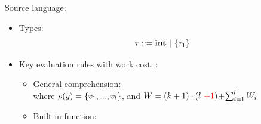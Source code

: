 \documentclass{beamer}
\begin{document}
\begin{frame}{Source language: {\fmsnesl}}
\begin{itemize}
	\item Types: $$\tau ::= \int \ | \ \tseq{\tau_1}$$
 	\item Key evaluation rules with work cost,  : \\
 	\begin{itemize}
 	\item General comprehension: \\[1ex]
  where $\rho(y)=\{\replc{l}{v}\}$, and $W =  (k+1)\cdot (l \ {\color{red}+1}) \!+\!\sum_{i=1}^{l}W_i $ \\[2ex]
  
   \item Built-in function: 
	\end{itemize}
\end{itemize}
\end{frame}
\end{document}
